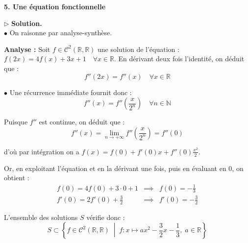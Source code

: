 \documentclass[11pt,a4paper]{report}
\begin{document}
\begin{center}
    \large \textbf{5. Une équation fonctionnelle}
\end{center}
\vspace{0.2cm}

\noindent{}
\vspace{0.4cm}

\noindent $\triangleright$ \textbf{Solution.} \\
\noindent $\bullet$ On raisonne par analyse-synthèse.

\noindent \textbf{Analyse :} Soit $f \in \mathcal{C}^2(\mathbb{R}, \mathbb{R})$ une solution de l'équation : $f(2x) = 4f(x) + 3x + 1 \quad \forall x \in \mathbb{R}$. En dérivant deux fois l'identité, on déduit que :
$$ f''(2x) = f''(x) \quad \forall x \in \mathbb{R} $$   

\noindent $\bullet$ Une récurrence immédiate fournit donc :
$$ f''(x) = f''\left(\frac{x}{2^n}\right) \quad \forall n \in \mathbb{N} $$

\noindent Puisque $f''$ est continue, on déduit que :
$$ f''(x) = \lim_{n \to +\infty} f''\left(\frac{x}{2^n}\right) = f''(0) $$

\noindent d'où par intégration on a $f(x) = f(0) + f'(0)x + f''(0)\frac{x^2}{2}$.

\noindent Or, en exploitant l'équation et en la dérivant une fois, puis en évaluant en $0$, on obtient :
$$ \begin{array}{lcl} f(0) = 4f(0) + 3 \cdot 0 + 1 & \implies & f(0) = -\frac{1}{3} \\ f'(0) = 2f'(0) + \frac{3}{2} & \implies & f'(0) = -\frac{3}{2} \end{array} $$

\noindent L'ensemble des solutions $S$ vérifie donc :
$$ S \subset \left\{ f \in \mathcal{C}^2(\mathbb{R}, \mathbb{R}) \;\middle|\; f : x \mapsto ax^2 - \frac{3}{2}x - \frac{1}{3}, \; a \in \mathbb{R} \right\} $$
\end{document}
